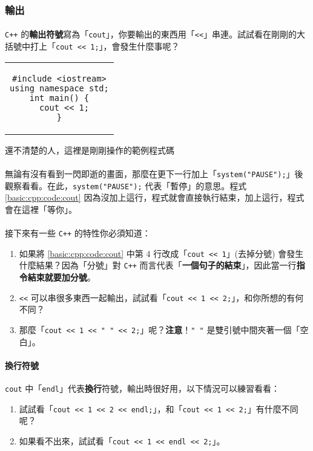 \documentclass[12pt,a4paper,oneside]{article}
\begin{document}
\begin{CJK}{UTF8}{bkai}
\subsubsection{輸出}

\paragraph{}\texttt{C++} 的\textbf{輸出符號}寫為「\lstinline!cout!」，你要輸出的東西用「\lstinline!<<!」串連。試試看在剛剛的大括號中打上「\lstinline!cout << 1;!」，會發生什麼事呢？

\begin{code}[h!]
\centering
\begin{tabular}{c}
\begin{lstlisting}
#include <iostream>
using namespace std;
int main() {
  cout << 1;
}
\end{lstlisting}
\end{tabular}
\caption{還不清楚的人，這裡是剛剛操作的範例程式碼}
\label{basic:cpp:code:cout}
\end{code}

\paragraph{}無論有沒有看到一閃即逝的畫面，那麼在更下一行加上「\lstinline!system("PAUSE");!」後觀察看看。在此，\lstinline!system("PAUSE");! 代表「暫停」的意思。程式 \ref{basic:cpp:code:cout} 因為沒加上這行，程式就會直接執行結束，加上這行，程式會在這裡「等你」。

\paragraph{}接下來有一些 \texttt{C++} 的特性你必須知道：
\begin{enumerate}
\item 如果將 \ref{basic:cpp:code:cout} 中第 4 行改成「\lstinline!cout << 1!」(去掉分號) 會發生什麼結果？因為「分號」對 \texttt{C++} 而言代表「\textbf{一個句子的結束}」，因此當一行\textbf{指令結束就要加分號}。
\item \lstinline!<<! 可以串很多東西一起輸出，試試看「\lstinline!cout << 1 << 2;!」，和你所想的有何不同？
\item 那麼「\lstinline!cout << 1 << " " << 2;!」呢？\textbf{注意}！\lstinline!" "! 是雙引號中間夾著一個「空白」。
\end{enumerate}

\paragraph{換行符號}\lstinline!cout! 中「\lstinline!endl!」代表\textbf{換行}符號，輸出時很好用，以下情況可以練習看看：
\begin{enumerate}
\item 試試看「\lstinline!cout << 1 << 2 << endl;!」，和「\lstinline!cout << 1 << 2;!」有什麼不同呢？
\item 如果看不出來，試試看「\lstinline!cout << 1 << endl << 2;!」。
\end{enumerate}


\end{CJK}
\end{document}
